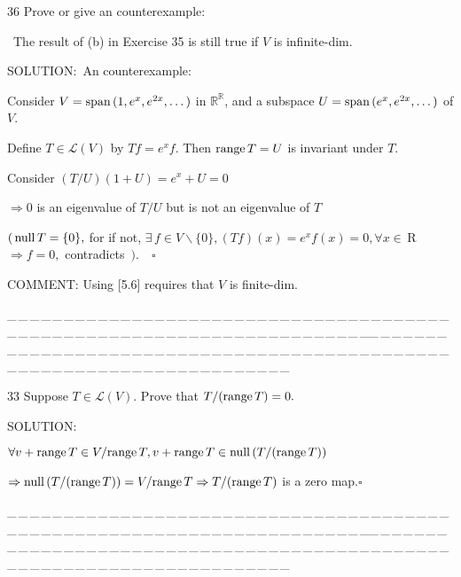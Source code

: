 \documentclass[a4paper, 11pt, UTF8]{article}
\def\range{\textup{range}\,}
\def\null{\textup{null\,}}
\def\Spn{\textup{span}\,}
\def\Lm{\mathcal{L}}
\def\Rbf{$\,{\timesbf R}\,$}
\def\Rbb{\mathbb{R}}
\begin{document}
\begin{large}
{\timesbf\Large 36} {\timessl\Large 
Prove or give an counterexample:}\par\quad\,
{\timessl\Large The result of } {\Large(b)} {\timessl\Large in Exercise 35 is still true if $V$ is infinite-dim.
}\par
{\timesbf S\footnotesize{OLUTION:}}\,\,\,An counterexample:\par\quad
Consider $V=\Spn(1,e^x,e^{2x},\dots)$ in $\Rbb^\Rbb$, and a subspace $U=\Spn(e^x,e^{2x},\dots)$ of $V$.\par\quad
Define $T\in\Lm(V)$ by $Tf=e^x f.$ Then $\range T=U$ is invariant under $T.$\par\quad
Consider $(T/U)(1+U)=e^x+U=0$\par\quad
$\Rightarrow 0$ is an eigenvalue of $T/U$ but is not an eigenvalue of $T$\par\quad
$(\,\null T=\{0\},$ for if not, $\exists\,f\in V\backslash\{0\},(Tf)(x)=e^{x}f(x)=0,\forall x\in\Rbf\Rightarrow f=0,$ contradicts $\,).\quad\square$\par
C{\small OMMENT:} Using [5.6] requires that $V$ is finite-dim.\par
{\tiny \_\,\_\,\_\,\_\,\_\,\_\,\_\,\_\,\_\,\_\,\_\,\_\,\_\,\_\,\_\,\_\,\_\,\_\,\_\,\_\,\_\,\_\,\_\,\_\,\_\,\_\,\_\,\_\,\_\,\_\,\_\,\_\,\_\,\_\,\_\,\_\,\_\,\_\,\_\,\_\,\_\,\_\,\_\,\_\,\_\,\_\,\_\,\_\,\_\,\_\,\_\,\_\,\_\,\_\,\_\,\_\,\_\,\_\,\_\,\_\,\_\,\_\,\_\,\_\,\_\,\_\,\_\,\_\,\_\,\_\,\_\_\,\_\,\_\,\_\,\_\,\_\,\_\,\_\,\_\,\_\,\_\,\_\,\_\,\_\,\_\,\_\,\_\,\_\,\_\,\_\,\_\,\_\,\_\,\_\,\_\,\_\,\_\,\_\,\_\,\_\,\_\,\_\,\_\,\_\,\_\,\_\,\_\,\_\,\_\,\_\,\_\,\_\,\_\,\_\,\_\,\_\,\_\,\_\,\_\,\_\,\_\,\_\,\_\,\_\,\_\,\_\,\_\,\_\,\_\,\_\,\_\,\_\,\_\,\_\,\_\,\_\,\_\,\_\,\_\,\_\,\_}\par


{\timesbf\Large 33} {\timessl\Large 
Suppose $T\in\Lm(V).$ Prove that $T/(\range T)=0.$
}\par
{\timesbf S\footnotesize{OLUTION:}}\par\quad
$\forall v+\range T\in V/\range T,v+\range T\in\null(T/(\range T))$\par\quad
$\Rightarrow\null(T/(\range T))=V/\range T\Rightarrow T/(\range T)$ is a zero map.\quad$\square$\par
{\tiny \_\,\_\,\_\,\_\,\_\,\_\,\_\,\_\,\_\,\_\,\_\,\_\,\_\,\_\,\_\,\_\,\_\,\_\,\_\,\_\,\_\,\_\,\_\,\_\,\_\,\_\,\_\,\_\,\_\,\_\,\_\,\_\,\_\,\_\,\_\,\_\,\_\,\_\,\_\,\_\,\_\,\_\,\_\,\_\,\_\,\_\,\_\,\_\,\_\,\_\,\_\,\_\,\_\,\_\,\_\,\_\,\_\,\_\,\_\,\_\,\_\,\_\,\_\,\_\,\_\,\_\,\_\,\_\,\_\,\_\,\_\_\,\_\,\_\,\_\,\_\,\_\,\_\,\_\,\_\,\_\,\_\,\_\,\_\,\_\,\_\,\_\,\_\,\_\,\_\,\_\,\_\,\_\,\_\,\_\,\_\,\_\,\_\,\_\,\_\,\_\,\_\,\_\,\_\,\_\,\_\,\_\,\_\,\_\,\_\,\_\,\_\,\_\,\_\,\_\,\_\,\_\,\_\,\_\,\_\,\_\,\_\,\_\,\_\,\_\,\_\,\_\,\_\,\_\,\_\,\_\,\_\,\_\,\_\,\_\,\_\,\_\,\_\,\_\,\_\,\_\,\_}\par


\end{large}
\end{document}

